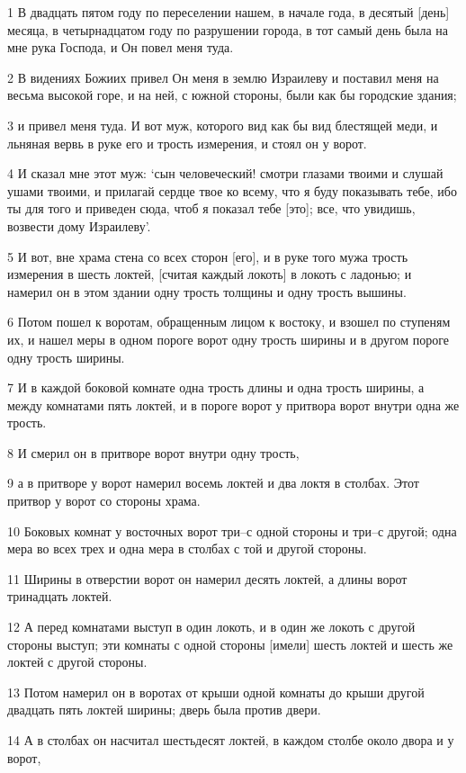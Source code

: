 \par 1 В двадцать пятом году по переселении нашем, в начале года, в десятый [день] месяца, в четырнадцатом году по разрушении города, в тот самый день была на мне рука Господа, и Он повел меня туда.
\par 2 В видениях Божиих привел Он меня в землю Израилеву и поставил меня на весьма высокой горе, и на ней, с южной стороны, были как бы городские здания;
\par 3 и привел меня туда. И вот муж, которого вид как бы вид блестящей меди, и льняная вервь в руке его и трость измерения, и стоял он у ворот.
\par 4 И сказал мне этот муж: `сын человеческий! смотри глазами твоими и слушай ушами твоими, и прилагай сердце твое ко всему, что я буду показывать тебе, ибо ты для того и приведен сюда, чтоб я показал тебе [это]; все, что увидишь, возвести дому Израилеву'.
\par 5 И вот, вне храма стена со всех сторон [его], и в руке того мужа трость измерения в шесть локтей, [считая каждый локоть] в локоть с ладонью; и намерил он в этом здании одну трость толщины и одну трость вышины.
\par 6 Потом пошел к воротам, обращенным лицом к востоку, и взошел по ступеням их, и нашел меры в одном пороге ворот одну трость ширины и в другом пороге одну трость ширины.
\par 7 И в каждой боковой комнате одна трость длины и одна трость ширины, а между комнатами пять локтей, и в пороге ворот у притвора ворот внутри одна же трость.
\par 8 И смерил он в притворе ворот внутри одну трость,
\par 9 а в притворе у ворот намерил восемь локтей и два локтя в столбах. Этот притвор у ворот со стороны храма.
\par 10 Боковых комнат у восточных ворот три--с одной стороны и три--с другой; одна мера во всех трех и одна мера в столбах с той и другой стороны.
\par 11 Ширины в отверстии ворот он намерил десять локтей, а длины ворот тринадцать локтей.
\par 12 А перед комнатами выступ в один локоть, и в один же локоть с другой стороны выступ; эти комнаты с одной стороны [имели] шесть локтей и шесть же локтей с другой стороны.
\par 13 Потом намерил он в воротах от крыши одной комнаты до крыши другой двадцать пять локтей ширины; дверь была против двери.
\par 14 А в столбах он насчитал шестьдесят локтей, в каждом столбе около двора и у ворот,
